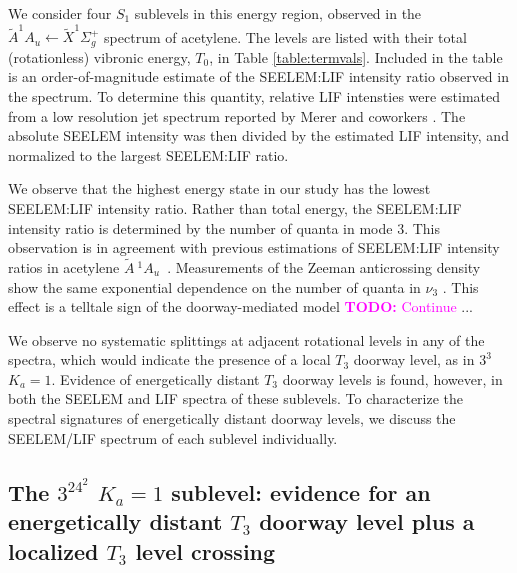 \documentclass[12pt]{mitthesis}
\newcommand{\TODO} [1]{\textcolor{magenta}{\textbf{TODO:} #1}}
\newcommand{\astate}{$
  \tilde{A} \: ^1\!A_u
  $}
\newcommand{\Ka}[1]{$K_a\!\!=\!#1$}
\begin{document}
We consider four $S_1$ sublevels in this energy region, observed in
the $\tilde{A}^1A_u \leftarrow \tilde{X} ^1\Sigma_g^+$ spectrum of
acetylene.  The levels are listed with their total (rotationless)
vibronic energy, $T_0$, in Table \ref{table:termvals}.  Included in
the table is an order-of-magnitude estimate of the SEELEM:LIF
intensity ratio observed in the spectrum.  To determine this quantity,
relative LIF intensties were estimated from a low resolution jet
spectrum reported by Merer and coworkers \cite{merer03}.  The absolute
SEELEM intensity was then divided by the estimated LIF intensity, and
normalized to the largest SEELEM:LIF ratio.

We observe that the highest energy state in our study has the lowest
SEELEM:LIF intensity ratio.  Rather than total energy, the SEELEM:LIF
intensity ratio is determined by the number of quanta in mode 3.  This
observation is in agreement with previous estimations of SEELEM:LIF
intensity ratios in acetylene \astate\ \cite{humphrey97}.  Measurements
of the Zeeman anticrossing density show the same exponential
dependence on the number of quanta in $\nu_3$ \cite{dupre91}.  This
effect is a telltale sign of the doorway-mediated model
\TODO{Continue} ...

We observe no systematic splittings at adjacent rotational levels in
any of the spectra, which would indicate the presence of a local $T_3$
doorway level, as in $3^3$ \Ka{1}.  Evidence of energetically distant
$T_3$ doorway levels is found, however, in both the SEELEM and LIF
spectra of these sublevels.  To characterize the spectral signatures
of energetically distant doorway levels, we discuss the SEELEM/LIF
spectrum of each sublevel individually.


\subsection{The $3^24^2$ \Ka{1} sublevel: evidence for an
  energetically distant $T_3$ doorway level plus a localized $T_3$
  level crossing}


\end{document}
